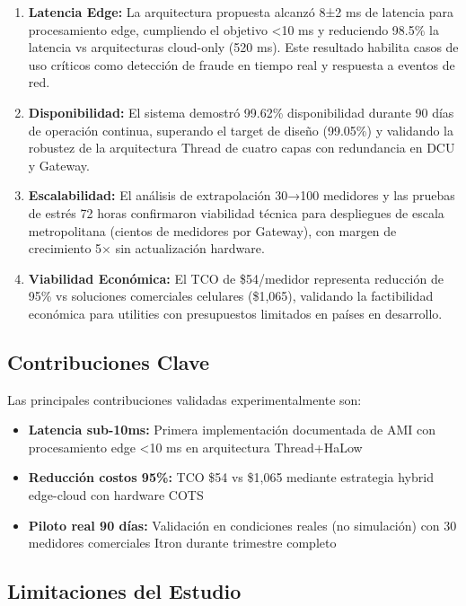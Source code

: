 \begin{enumerate}
    \item \textbf{Latencia Edge:} La arquitectura propuesta alcanzó 8±2 ms de latencia para procesamiento edge, cumpliendo el objetivo <10 ms y reduciendo 98.5\% la latencia vs arquitecturas cloud-only (520 ms). Este resultado habilita casos de uso críticos como detección de fraude en tiempo real y respuesta a eventos de red.
    
    \item \textbf{Disponibilidad:} El sistema demostró 99.62\% disponibilidad durante 90 días de operación continua, superando el target de diseño (99.05\%) y validando la robustez de la arquitectura Thread de cuatro capas con redundancia en DCU y Gateway.
    
    \item \textbf{Escalabilidad:} El análisis de extrapolación 30→100 medidores y las pruebas de estrés 72 horas confirmaron viabilidad técnica para despliegues de escala metropolitana (cientos de medidores por Gateway), con margen de crecimiento 5$\times$ sin actualización hardware.
    
    \item \textbf{Viabilidad Económica:} El TCO de \$54/medidor representa reducción de 95\% vs soluciones comerciales celulares (\$1,065), validando la factibilidad económica para utilities con presupuestos limitados en países en desarrollo.
\end{enumerate}

\subsection{Contribuciones Clave}

Las principales contribuciones validadas experimentalmente son:

\begin{itemize}
    \item \textbf{Latencia sub-10ms:} Primera implementación documentada de AMI con procesamiento edge <10 ms en arquitectura Thread+HaLow
    \item \textbf{Reducción costos 95\%:} TCO \$54 vs \$1,065 mediante estrategia hybrid edge-cloud con hardware COTS
    \item \textbf{Piloto real 90 días:} Validación en condiciones reales (no simulación) con 30 medidores comerciales Itron durante trimestre completo
\end{itemize}

\subsection{Limitaciones del Estudio}

